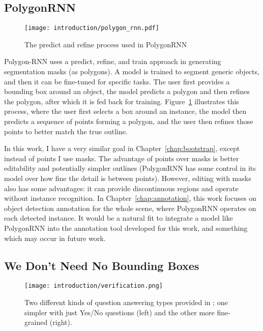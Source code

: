 \subsection {PolygonRNN \texorpdfstring{\cite{Castrejon2017}}{}}

\begin{figure}[h]
  \centering
  \texttt{[image: introduction/polygon\_rnn.pdf]}
  \caption{The predict and refine process used in PolygonRNN \cite{Castrejon2017}}  
  \label{fig:polygon_rnn}
\end{figure}


Polygon-RNN \cite{Castrejon2017} uses a predict, refine, and train approach in generating segmentation masks (as polygons). A model is trained to segment generic objects, and then it can be fine-tuned for specific tasks. The user first provides a bounding box around an object, the model predicts a polygon and then refines the polygon,  after which it is fed back for training. Figure~\ref{fig:polygon_rnn} illustrates this process, where the user first selects a box around an instance, the model then predicts a sequence of points forming a polygon, and the user then refines those points to better match the true outline.

In this work, I have a very similar goal in Chapter~\ref{chap:bootstrap}, except instead of points I use masks. The advantage of points over masks is better editability and potentially simpler outlines (PolygonRNN has some control in its model over how fine the detail is between points). However, editing with masks also has some advantages: it can provide discontinuous regions and operate without instance recognition. In Chapter~\ref{chap:annotation}, this work focuses on object detection annotation for the whole scene, where PolygonRNN operates on each detected instance. It would be a natural fit to integrate a model like PolygonRNN into the annotation tool developed for this work, and something which may occur in future work.


\subsection {We Don't Need No Bounding Boxes}

\begin{figure}[h]
  \centering
  \texttt{[image: introduction/verification.png]}
  \caption{Two different kinds of question answering types provided in \cite{Papadopoulos2016}; one simpler with just Yes/No questions (left) and the other more fine-grained (right).}
  \label{fig:verification}
\end{figure}

